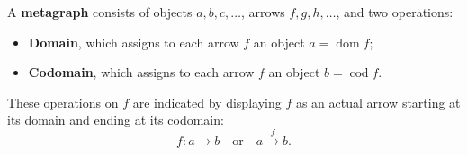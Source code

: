 A \textbf{metagraph} consists of objects $a, b, c, \ldots$, arrows $f, g, h, \ldots$, and two operations:
\begin{itemize}
\item \textbf{Domain}, which assigns to each arrow $f$ an object $a = \operatorname{dom} f$;
\item \textbf{Codomain}, which assigns to each arrow $f$ an object $b = \operatorname{cod} f$.
\end{itemize}
These operations on $f$ are indicated by displaying $f$ as an actual arrow starting at its domain and ending at its codomain:
$$f: a \rightarrow b \quad \text{or} \quad a \xrightarrow{f} b.$$
